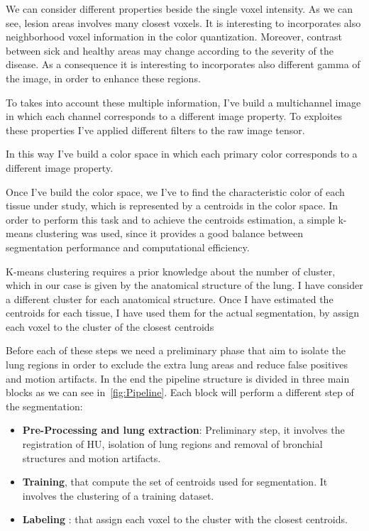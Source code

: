 \documentclass{standalone}
\begin{document}
	We can consider different properties beside the single voxel intensity. As we can see, lesion areas involves many closest voxels. It is interesting to incorporates also neighborhood voxel information in the color quantization. Moreover, contrast between sick and healthy areas may change according to the severity of the disease. As a consequence it is interesting to incorporates also different gamma of the image, in order to enhance these regions.
	
	To takes into account these multiple information, I've build a multichannel image in which each channel corresponds to a different image property. To exploites these properties I've applied different filters to the raw image tensor. 
	
	In this way I've build a color space in which each primary color corresponds to a different image property.
		
	Once I've build the color space, we I've to find the characteristic color of each tissue under study, which is represented by a centroids in the color space. In order to perform this task and to achieve the centroids estimation, a simple k-means clustering was used, since it provides a good balance between segmentation performance and computational efficiency.
	
	K-means clustering requires a prior knowledge about the number of cluster, which in our case is given by the anatomical structure of the lung. I have consider a different cluster for each anatomical structure.
	Once I have estimated the centroids for each tissue, I have used them for the actual segmentation, by assign each voxel to the cluster of the closest centroids
			
	Before each of these steps we need a preliminary phase that aim to isolate the lung regions in order to exclude the extra lung areas and reduce false positives and motion artifacts.
	In the end the pipeline structure is divided in three main blocks as we can see in \figurename\,\ref{fig:Pipeline}. Each block will perform a different step of the segmentation: 
	\begin{itemize}
		\item \textbf{Pre-Processing and lung extraction}: Preliminary step, it involves the registration of HU, isolation of lung regions and removal of bronchial structures and motion artifacts.
		
		\item \textbf{Training}, that compute the set of centroids used for segmentation. It involves the clustering of a training dataset. 
		
		\item \textbf{Labeling} :  that assign each voxel to the cluster with the closest centroids.
	\end{itemize}
	
\end{document}
